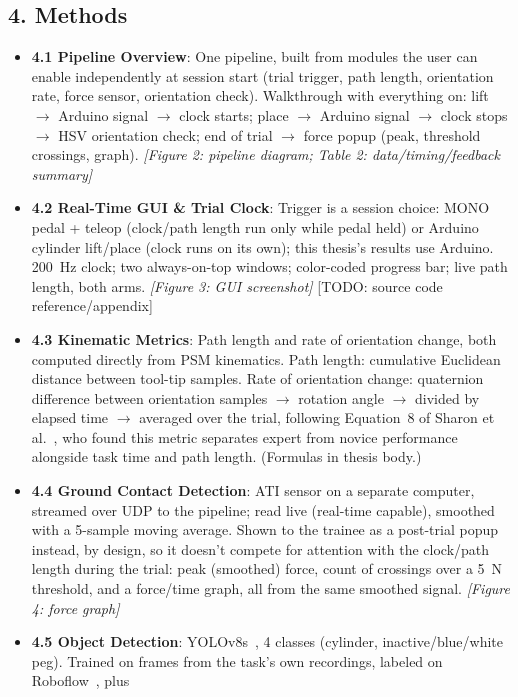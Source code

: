 \documentclass[11pt]{article}
\begin{document}
\subsection*{4. Methods}
\begin{itemize}
  \item \textbf{4.1 Pipeline Overview}: One pipeline, built from
  modules the user can enable independently at session start (trial
  trigger, path length, orientation rate, force sensor, orientation
  check). Walkthrough with everything on: lift $\to$ Arduino signal
  $\to$ clock starts; place $\to$ Arduino signal $\to$ clock stops
  $\to$ HSV orientation check; end of trial $\to$ force popup (peak,
  threshold crossings, graph). \emph{[Figure 2: pipeline diagram;
  Table 2: data/timing/feedback summary]}
  \item \textbf{4.2 Real-Time GUI \& Trial Clock}: Trigger is a
  session choice: MONO pedal + teleop (clock/path length run only
  while pedal held) or Arduino cylinder lift/place (clock runs on its
  own); this thesis's results use Arduino. 200~Hz clock; two
  always-on-top windows; color-coded progress bar; live path length,
  both arms. \emph{[Figure 3: GUI screenshot]} [TODO: source code
  reference/appendix]
  \item \textbf{4.3 Kinematic Metrics}: Path length and rate of
  orientation change, both computed directly from PSM kinematics.
  Path length: cumulative Euclidean distance between tool-tip
  samples. Rate of orientation change: quaternion difference between
  orientation samples $\to$ rotation angle $\to$ divided by elapsed
  time $\to$ averaged over the trial, following Equation~8 of Sharon
  et al.~\cite{sharon2021}, who found this metric separates expert
  from novice performance alongside task time and path length.
  (Formulas in thesis body.)
  \item \textbf{4.4 Ground Contact Detection}: ATI sensor on a
  separate computer, streamed over UDP to the pipeline; read live
  (real-time capable), smoothed with a 5-sample moving average.
  Shown to the trainee as a post-trial popup instead, by design, so
  it doesn't compete for attention with the clock/path length during
  the trial: peak (smoothed) force, count of crossings over a 5~N
  threshold, and a force/time graph, all from the same smoothed
  signal. \emph{[Figure 4: force graph]}
  \item \textbf{4.5 Object Detection}: YOLOv8s~\cite{yolov8}, 4 classes
  (cylinder, inactive/blue/white peg). Trained on frames from the
  task's own recordings, labeled on Roboflow~\cite{roboflow}, plus

\end{itemize}
\end{document}
